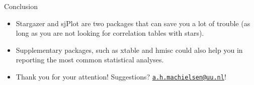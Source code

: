\documentclass[
  10pt,
  ignorenonframetext,
]{beamer}
\begin{document}
\begin{frame}{Conclusion}
\protect\hypertarget{conclusion}{}

\begin{itemize}
\item
  Stargazer and sjPlot are two packages that can save you a lot of
  trouble (as long as you are not looking for correlation tables with
  stars).
\item
  Supplementary packages, such as xtable and hmisc could also help you
  in reporting the most common statistical analyses.
\item
  Thank you for your attention! Suggestions?
  \href{mailto:a.h.machielsen@uu.nl}{\nolinkurl{a.h.machielsen@uu.nl}}!
\end{itemize}

\end{frame}
\end{document}

